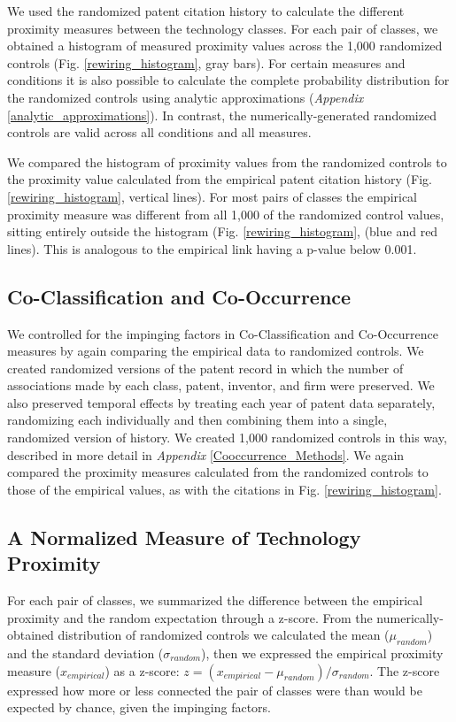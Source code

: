 \documentclass[]{svjour3}
\begin{document}
We used the randomized patent citation history to calculate the different proximity measures between the technology classes. For each pair of classes, we obtained a histogram of measured proximity values across the 1,000 randomized controls (Fig. \ref{rewiring_histogram}, gray bars). For certain measures and conditions it is also possible to calculate the complete probability distribution for the randomized controls using analytic approximations (\textit{Appendix} \ref{analytic_approximations}). In contrast, the numerically-generated randomized controls are valid across all conditions and all measures.

We compared the histogram of proximity values from the randomized controls to the proximity value calculated from the empirical patent citation history (Fig. \ref{rewiring_histogram}, vertical lines). For most pairs of classes the empirical proximity measure was different from all 1,000 of the randomized control values, sitting entirely outside the histogram (Fig. \ref{rewiring_histogram}, (blue and red lines). This is analogous to the empirical link having a p-value below 0.001.

\subsection{Co-Classification and Co-Occurrence}
We controlled for the impinging factors in Co-Classification and Co-Occurrence measures by again comparing the empirical data to randomized controls. We created randomized versions of the patent record in which the number of associations made by each class, patent, inventor, and firm were preserved. We also preserved temporal effects by treating each year of patent data separately, randomizing each individually and then combining them into a single, randomized version of history. We created 1,000 randomized controls in this way, described in more detail in \textit{Appendix} \ref{Cooccurrence_Methods}. We again compared the proximity measures calculated from the randomized controls to those of the empirical values, as with the citations in Fig. \ref{rewiring_histogram}.

\subsection{A Normalized Measure of Technology Proximity}
For each pair of classes, we summarized the difference between the empirical proximity and the random expectation through a z-score. From the  numerically-obtained distribution of randomized controls we calculated the mean ($\mu_{random}$) and the standard deviation ($\sigma_{random}$), then we expressed the empirical proximity measure ($x_{empirical}$) as a z-score: $z = (x_{empirical} - \mu_{random})/\sigma_{random}$. The z-score expressed how more or less connected the pair of classes were than would be expected by chance, given the impinging factors.
\end{document}
